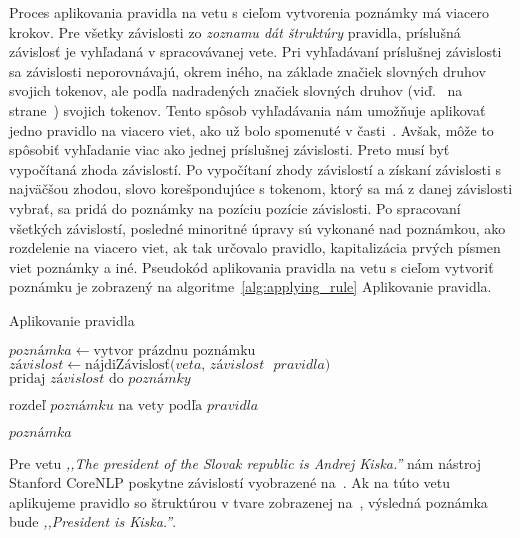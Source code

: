 Proces aplikovania pravidla na vetu s cieľom vytvorenia poznámky má viacero krokov. Pre všetky závislosti zo \textit{zoznamu dát štruktúry} pravidla, príslušná závislosť je vyhľadaná v spracovávanej vete. Pri vyhľadávaní príslušnej závislosti sa závislosti neporovnávajú, okrem iného, na základe značiek slovných druhov svojich tokenov, ale podľa nadradených značiek slovných druhov (viď.~ na strane~\pageref{paragraph:superior_pos_tag}) svojich tokenov. Tento spôsob vyhľadávania nám umožňuje aplikovať jedno pravidlo na viacero viet, ako už bolo spomenuté v časti~. Avšak, môže to spôsobiť vyhľadanie viac ako jednej príslušnej závislosti. Preto musí byť vypočítaná zhoda závislostí. Po vypočítaní zhody závislostí a získaní závislosti s najväčšou zhodou, slovo korešpondujúce s tokenom, ktorý sa má z danej závislosti vybrať, sa pridá do poznámky na pozíciu pozície závislosti. Po spracovaní všetkých závislostí, posledné minoritné úpravy sú vykonané nad poznámkou, ako rozdelenie na viacero viet, ak tak určovalo pravidlo, kapitalizácia prvých písmen viet poznámky a iné. Pseudokód aplikovania pravidla na vetu s cieľom vytvoriť poznámku je zobrazený na algoritme~\ref{alg:applying_rule} Aplikovanie pravidla.

\begin{algorithm}
	\caption[Aplikovanie pravidla]{Aplikovanie pravidla}\label{alg:applying_rule}
	\begin{algorithmic}[1]
		\State $poznámka \gets \text{vytvor prázdnu poznámku}$
		\State $závislost \gets \text{nájdiZávislosť(} veta \text{, } závislost\text{ } pravidla \text{)}$
		\State $\text{pridaj } závislost \text{ do } poznámky$
		\EndIf
		\EndFor
		
		\State $\text{rozdeľ } poznámku \text{ na vety podľa } pravidla$	
		
		\Return $poznámka$
		\EndProcedure
	\end{algorithmic}
\end{algorithm}

Pre vetu \textit{,,The president of the Slovak republic is Andrej Kiska.''} nám nástroj Stanford CoreNLP poskytne závislostí vyobrazené na~. Ak na túto vetu aplikujeme pravidlo so štruktúrou v tvare zobrazenej na~, výsledná poznámka bude \textit{,,President is Kiska.''}. 


